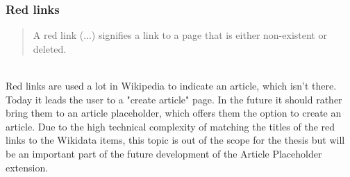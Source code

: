 \subsubsection{Red links}
\begin{quotation}
A red link (...) signifies a link to a page that is either non-existent or deleted. 
\end{quotation} \cite{wiki:01} %
\\
Red links are used a lot in Wikipedia to indicate an article, which isn't there. Today it leads the user to a "create article" page. In the future it should rather bring them to an article placeholder, which offers them the option to create an article. Due to the high technical complexity of matching the titles of the red links to the Wikidata items, this topic is out of the scope for the thesis but will be an important part of the future development of the Article Placeholder extension. 

